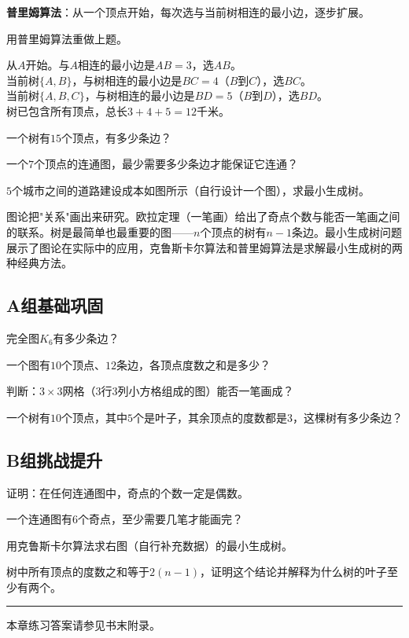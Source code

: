 \textbf{普里姆算法}：从一个顶点开始，每次选与当前树相连的最小边，逐步扩展。

\begin{example}
用普里姆算法重做上题。
\end{example}
\begin{solution}
从$A$开始。与$A$相连的最小边是$AB=3$，选$AB$。\\
当前树$\{A,B\}$，与树相连的最小边是$BC=4$（$B$到$C$），选$BC$。\\
当前树$\{A,B,C\}$，与树相连的最小边是$BD=5$（$B$到$D$），选$BD$。\\
树已包含所有顶点，总长$3+4+5=12$千米。
\end{solution}

\begin{exercise}
\item 一个树有$15$个顶点，有多少条边？
\item 一个$7$个顶点的连通图，最少需要多少条边才能保证它连通？
\item $5$个城市之间的道路建设成本如图所示（自行设计一个图），求最小生成树。
\end{exercise}


图论把"关系"画出来研究。欧拉定理（一笔画）给出了奇点个数与能否一笔画之间的联系。树是最简单也最重要的图——$n$个顶点的树有$n-1$条边。最小生成树问题展示了图论在实际中的应用，克鲁斯卡尔算法和普里姆算法是求解最小生成树的两种经典方法。


\subsection*{A组\quad 基础巩固}

\begin{exercise}
\item 完全图$K_6$有多少条边？
\item 一个图有$10$个顶点、$12$条边，各顶点度数之和是多少？
\item 判断：$3\times3$网格（$3$行$3$列小方格组成的图）能否一笔画成？
\item 一个树有$10$个顶点，其中$5$个是叶子，其余顶点的度数都是$3$，这棵树有多少条边？
\end{exercise}

\subsection*{B组\quad 挑战提升}

\begin{exercise}
\item 证明：在任何连通图中，奇点的个数一定是偶数。
\item 一个连通图有$6$个奇点，至少需要几笔才能画完？
\item 用克鲁斯卡尔算法求右图（自行补充数据）的最小生成树。
\item 树中所有顶点的度数之和等于$2(n-1)$，证明这个结论并解释为什么树的叶子至少有两个。
\end{exercise}

\vfill
\noindent\rule{\textwidth}{0.4pt}
本章练习答案请参见书末附录。
